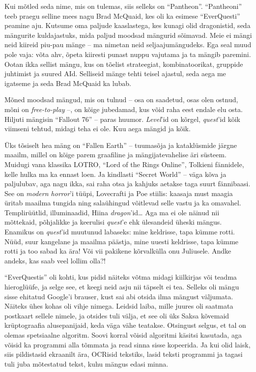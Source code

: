 Kui mõtled seda nime, mis on tulemas, siis selleks on 
\enquote{Pantheon}. \enquote{Pantheoni} teeb praegu selline mees nagu Brad McQuaid, kes oli ka 
esimese \enquote{EverQuesti} peamine aju. Kutsume oma paljude 
kaaslastega, kes kunagi olid dragonistid, seda mängurite kuldajastuks, 
mida paljud moodsad mängurid sõimavad. Meie ei mängi neid kiireid 
piu-pau mänge -- ma nimetan neid seljaajumängudeks. Ega seal muud pole vaja: 
võta ahv, õpeta kiiresti punast nuppu vajutama ja ta mängib paremini. Ootan ikka 
sellist mängu, kus on tõelist strateegiat, kombinatoorikat, gruppide juhtimist ja 
suured AId. Selliseid mänge tehti teisel ajastul, seda aega me igatseme 
ja seda Brad McQuaid ka lubab.

Mõned moodsad mängud, mis on tulnud -- osa on saadetud, osas olen ostnud, 
mõni on \emph{free-to-play} --, on kõige jubedamad, kus võid raha eest 
endale elu osta. Hiljuti mängisin \enquote{Fallout 76} -- paras huumor. 
\emph{Level}'id on kõrgel, \emph{quest}'id kõik viimseni tehtud, midagi teha ei 
ole. Kuu aega mängid ja kõik. 

Üks tõsiselt hea mäng on \enquote{Fallen Earth} -- 
tuumasõja ja kata{\-}klüsmide järgne maailm, millel on
kõige parem graafiline ja mängijatevahelise äri süsteem. Muidugi 
vana klassika LOTRO, \enquote{Lord of the Rings Online}, Tolkieni fännidele, kelle hulka 
ma ka ennast loen. Ja kindlasti \enquote{Secret World} -- väga kõva ja paljulubav, 
aga nagu ikka, sai raha otsa ja kahjuks aetakse taga suurt fännibaasi. See on \emph{modern horror}'i tüüpi, Lovecrafti 
ja Poe stiilis: kaasaja must maagia üritab maailma 
tungida ning salaühingud võitlevad selle vastu ja ka omavahel. Templirüütlid, 
illuminaadid, Hiina \emph{dragon}'id\ldots{ }Aga ma ei ole näinud nii mõttekaid, 
põhjalikke ja keerulisi \emph{quest}'e ehk ülesandeid üheski mängus. Enamikus on 
\emph{quest}'id muutunud labaseks: mine 
keldrisse, tapa kümme rotti. Nüüd, suur kangelane ja maailma päästja, mine uuesti 
keldrisse, tapa kümme rotti ja too sabad ka ära! Või vii pakikene kõrvalkülla onu 
Juliusele. Andke andeks, kas saab veel lollim olla?!

\enquote{EverQuestis} oli kohti, kus pidid näiteks võtma midagi kiilkirjas või 
teadma hieroglüüfe, ja selge see, et keegi neid asju nii täpselt ei tea. 
Selleks oli mängu sisse ehitatud Google'i brauser, kust sai abi otsida ilma mängust väljumata. Näiteks ühes kohas oli vihje 
nimega. Leidsid laiba, mille juures oli saatmata postkaart sellele nimele, ja 
otsides tuli välja, et see oli üks Saksa kõvemaid krüptograafia 
alusepanijaid, keda väga vähe teatakse. Otsingust selgus, et tal on olemas 
spetsiaalne algoritm. Soovi korral võisid algoritmi käsitsi kasutada, aga 
võisid ka programmi alla tõmmata ja read sinna sisse kopeerida. Ja kui olid laisk, siis pildistasid ekraanilt ära, OCRisid tekstiks, lasid teksti 
programmi ja tagasi tuli juba mõtestatud tekst, kuhu mängus edasi minna.
